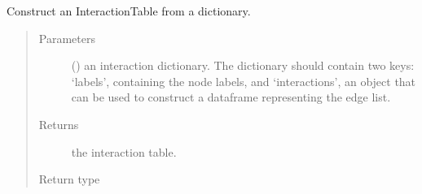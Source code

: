 \documentclass[letterpaper,10pt,english]{sphinxmanual}
\begin{document}

\begin{fulllineitems}
\label{\detokenize{_modules/cosifer.collections:cosifer.collections.interaction_table.interaction_table_from_dict}}
Construct an InteractionTable from a dictionary.
\begin{quote}\begin{description}
\item[{Parameters}] \leavevmode
{} () \textendash{} an interaction dictionary.
The dictionary should contain two keys: ‘labels’, containing the
node labels, and ‘interactions’, an object that can be used to
construct a dataframe representing the edge list.

\item[{Returns}] \leavevmode
the interaction table.

\item[{Return type}] \leavevmode
{\hyperref[\detokenize{_modules/cosifer.collections:cosifer.collections.interaction_table.InteractionTable}]{}}

\end{description}\end{quote}

\end{fulllineitems}

\end{document}
